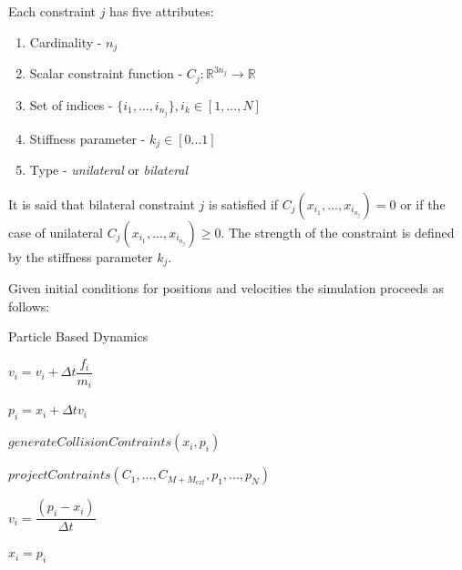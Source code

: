 \documentclass[en]{minipw} %
\begin{document}
Each constraint $j$ has five attributes:

\begin{enumerate}
\item Cardinality - $n_j$
\item Scalar constraint function - $C_j : \mathbb{R}^{3n_j} \rightarrow \mathbb{R}$
\item Set of indices - $\{i_1, ..., i_{n_{j}}\}, i_k \in [1, ..., N]$
\item Stiffness parameter - $k_j \in [0 ... 1]$
\item Type - \textit{unilateral} or \textit{bilateral}
\end{enumerate}

It is said that bilateral constraint $j$ is satisfied if $C_j(x_{i_{1}}, ..., x_{i_{n_{j}}}) = 0$ or if the case of unilateral $C_j(x_{i_{1}}, ..., x_{i_{n_{j}}}) \geq 0$. The strength of the constraint is defined by the stiffness parameter $k_j$.

Given initial conditions for positions and velocities the simulation proceeds as follows:


\begin{algorithm}
\caption{Particle Based Dynamics}\label{euclid}
\begin{algorithmic}[1]

\label{alg:pbd:main_loop}

\label{alg:pdb:explicit_for}

\State $v_{i} = v_{i} + \Delta t \dfrac{f_i}{m_i}$
\label{alg:pdb:explicit_v}

\State $p_{i} = x_{i} + \Delta t v_i$
\label{alg:pdb:explicit_p}

\State $generateCollisionContraints(x_i, p_i)$
\label{alg:pdb:generate_collision_contraints}

\EndFor

\label{alg:pdb:iter_while}

\State $projectContraints(C_1, ..., C_{M + M_{ext}}, p_1, ..., p_N)$
\label{alg:pdb:project_contraints}

\EndWhile

\State $v_{i} = \dfrac{(p_i - x_i)}{\Delta t} $
\label{alg:pdb:implicit_v}

\State $x_{i} = p_{i}$
\label{alg:pdb:implicit_x}

\EndFor

\EndWhile

\EndProcedure
\end{algorithmic}
\end{algorithm}
\end{document}
